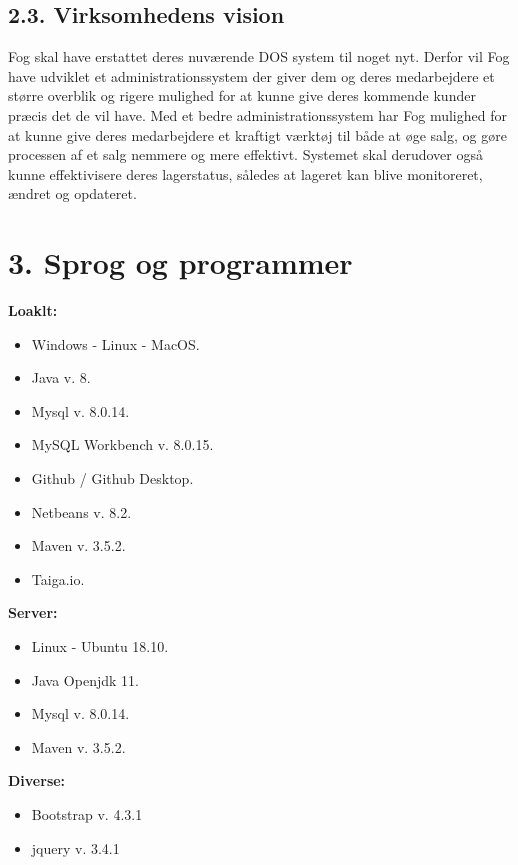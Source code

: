 \documentclass[11pt]{report}
\begin{document}
\section*{2.3. Virksomhedens vision}
Fog skal have erstattet deres nuværende DOS system til noget nyt. Derfor vil Fog have udviklet et administrationssystem der giver dem og deres medarbejdere et større overblik og rigere mulighed for at kunne give deres kommende kunder præcis det de vil have. Med et bedre administrationssystem har Fog mulighed for at kunne give deres medarbejdere et kraftigt værktøj til både at øge salg, og gøre processen af et salg nemmere og mere effektivt. Systemet skal derudover også kunne effektivisere deres lagerstatus, således at lageret kan blive monitoreret, ændret og opdateret.  
\newpage

\chapter*{3. Sprog og programmer}
\textbf{Loaklt:}
\begin{itemize}
  \item Windows - Linux - MacOS.
  \item Java v. 8.
  \item Mysql v. 8.0.14.
  \item MySQL Workbench v. 8.0.15.
  \item Github / Github Desktop.
  \item Netbeans v. 8.2.
  \item Maven v. 3.5.2.
  \item Taiga.io.
\end{itemize}
\textbf{Server:}
\begin{itemize}
  \item Linux - Ubuntu 18.10.
  \item Java Openjdk 11.
  \item Mysql v. 8.0.14.
  \item Maven v. 3.5.2.
\end{itemize}
\textbf{Diverse:}
\begin{itemize}
  \item Bootstrap v. 4.3.1
  \item jquery v. 3.4.1
\end{itemize}
\newpage
\end{document}
